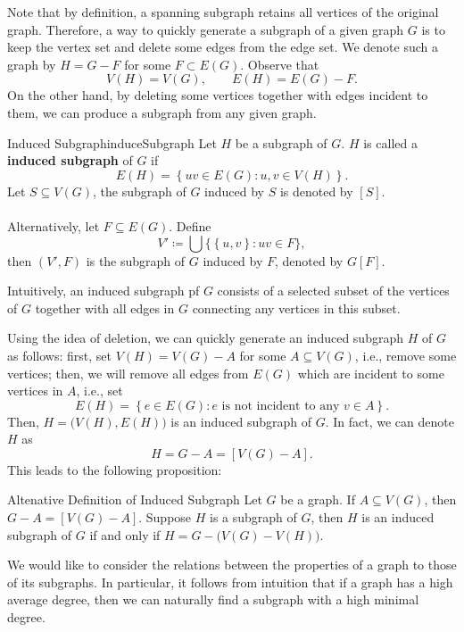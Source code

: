 \documentclass[math, code]{amznotes}
\theoremstyle{remark}
\begin{document}
Note that by definition, a spanning subgraph retains all vertices of the original graph. Therefore, a way to quickly generate a subgraph of a given graph $G$ is to keep the vertex set and delete some edges from the edge set. We denote such a graph by $H = G - F$ for some $F \subset E(G)$. Observe that 
\begin{equation*}
    V(H) = V(G), \qquad E(H) = E(G) - F.
\end{equation*}
On the other hand, by deleting some vertices together with edges incident to them, we can produce a subgraph from any given graph.
\begin{dfnbox}{Induced Subgraph}{induceSubgraph}
    Let $H$ be a subgraph of $G$. $H$ is called a {\color{red} \textbf{induced subgraph}} of $G$ if
    \begin{equation*}
        E(H) = \left\{uv \in E(G) \colon u, v \in V(H)\right\}.
    \end{equation*}
    Let $S \subseteq V(G)$, the subgraph of $G$ induced by $S$ is denoted by $[S]$.
    \\\\
    Alternatively, let $F \subseteq E(G)$. Define
    \begin{equation*}
        V' \coloneqq \bigcup \bigl\{\left\{u, v\right\} \colon uv \in F\bigr\},
    \end{equation*}
    then $(V', F)$ is the subgraph of $G$ induced by $F$, denoted by $G[F]$.
\end{dfnbox}
Intuitively, an induced subgraph pf $G$ consists of a selected subset of the vertices of $G$ together with all edges in $G$ connecting any vertices in this subset.

Using the idea of deletion, we can quickly generate an induced subgraph $H$ of $G$ as follows: first, set $V(H) = V(G) - A$ for some $A \subseteq V(G)$, i.e., remove some vertices; then, we will remove all edges from $E(G)$ which are incident to some vertices in $A$, i.e., set
\begin{equation*}
    E(H) = \left\{e \in E(G) \colon e \textrm{ is not incident to any } v \in A\right\}.
\end{equation*}
Then, $H = \bigl(V(H), E(H)\bigr)$ is an induced subgraph of $G$. In fact, we can denote $H$ as
\begin{equation*}
    H = G - A = [V(G) - A].
\end{equation*}
This leads to the following proposition:
\begin{probox}{Altenative Definition of Induced Subgraph}{}
    Let $G$ be a graph. If $A \subseteq V(G)$, then $G - A = [V(G) - A]$. Suppose $H$ is a subgraph of $G$, then $H$ is an induced subgraph of $G$ if and only if $H = G - \bigl(V(G) - V(H)\bigr)$.
\end{probox}
We would like to consider the relations between the properties of a graph to those of its subgraphs. In particular, it follows from intuition that if a graph has a high average degree, then we can naturally find a subgraph with a high minimal degree.
\end{document}
